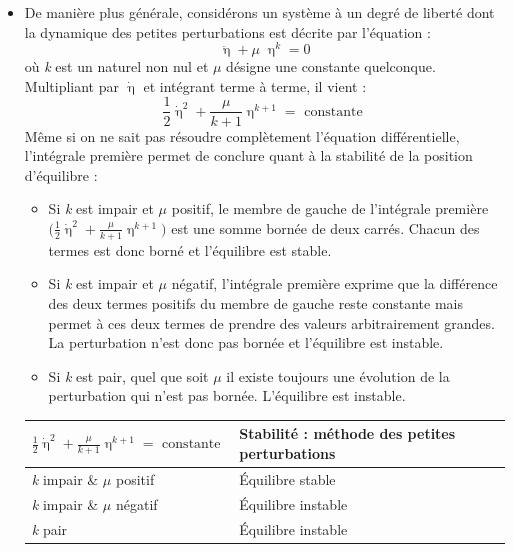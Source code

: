 \documentclass[a4paper]{article}
\begin{document}
\begin{itemize}
\item De manière plus générale, considérons un système à un degré de liberté dont la dynamique des petites perturbations est décrite par l'équation : 
\[ \ddot{\upeta} + \mu \; \upeta^k = 0 \]
où \emph{k} est un naturel non nul et $ \mu $ désigne une constante quelconque. Multipliant par $ \dot{\upeta} $ et intégrant terme à terme, il vient : 
\[ \frac{1}{2} \dot{\upeta}^2 + \frac{\mu}{k + 1} \upeta^{k + 1} = \text{ constante } \]
Même si on ne sait pas résoudre complètement l'équation différentielle, l'intégrale première permet de conclure quant à la stabilité de la position d'équilibre : 
\begin{itemize}
\item Si \emph{k} est impair et $ \mu $ positif, le membre de gauche de l'intégrale première $\displaystyle \Big( \frac{1}{2} \dot{\upeta}^2 + \frac{\mu}{k + 1} \upeta^{k + 1} \Big) $ est une somme bornée de deux carrés. Chacun des termes est donc borné et l'équilibre est stable.
\item Si \emph{k} est impair et $ \mu $ négatif, l'intégrale première exprime que la différence des deux termes positifs du membre de gauche reste constante mais permet à ces deux termes de prendre des valeurs arbitrairement grandes. La perturbation n'est donc pas bornée et l'équilibre est instable.
\item Si \emph{k} est pair, quel que soit $ \mu $ il existe toujours une évolution de la perturbation qui n'est pas bornée. L'équilibre est instable.
\end{itemize}

\begin{center} \begin{tabular}{|p{6cm}|p{6cm}|}
\hline
$\displaystyle \frac{1}{2} \dot{\upeta}^2 + \frac{\mu}{k + 1} \upeta^{k + 1} = \text{ constante } $ & Stabilité : méthode des petites perturbations \\
\hline
\emph{k} impair \; \& \; $ \mu $ positif & Équilibre stable \\
\hdashline
\emph{k} impair \; \& \; $ \mu $ négatif & Équilibre instable \\
\hdashline
\emph{k} pair & Équilibre instable \\
\hline
\end{tabular} \end{center}






\end{itemize}
\end{document}
